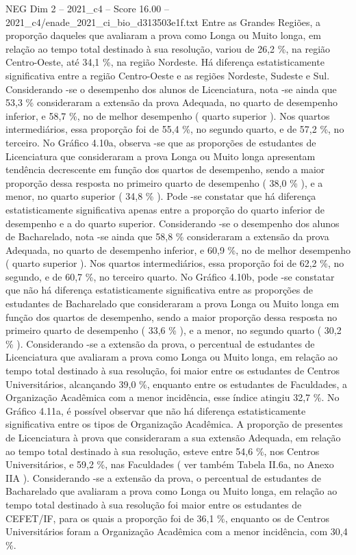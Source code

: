 \begin{textsample}{NEG Dim 2 – 2021\_c4 – Score 16.00 – 2021\_c4/enade\_2021\_ci\_bio\_d313503e1f.txt}
Entre as Grandes Regiões, a proporção daqueles que avaliaram a prova como Longa ou Muito longa, em relação ao tempo total destinado à sua resolução, variou de 26,2 \%, na região Centro-Oeste, até 34,1 \%, na região Nordeste.
Há diferença estatisticamente significativa entre a região Centro-Oeste e as regiões Nordeste, Sudeste e Sul.
Considerando -se o desempenho dos alunos de Licenciatura, nota -se ainda que 53,3 \% consideraram a extensão da prova Adequada, no quarto de desempenho inferior, e 58,7 \%, no de melhor desempenho ( quarto superior ).
Nos quartos intermediários, essa proporção foi de 55,4 \%, no segundo quarto, e de 57,2 \%, no terceiro.
No Gráfico 4.10a, observa -se que as proporções de estudantes de Licenciatura que consideraram a prova Longa ou Muito longa apresentam tendência decrescente em função dos quartos de desempenho, sendo a maior proporção dessa resposta no primeiro quarto de desempenho ( 38,0 \% ), e a menor, no quarto superior ( 34,8 \% ).
Pode -se constatar que há diferença estatisticamente significativa apenas entre a proporção do quarto inferior de desempenho e a do quarto superior.
Considerando -se o desempenho dos alunos de Bacharelado, nota -se ainda que 58,8 \% consideraram a extensão da prova Adequada, no quarto de desempenho inferior, e 60,9 \%, no de melhor desempenho ( quarto superior ).
Nos quartos intermediários, essa proporção foi de 62,2 \%, no segundo, e de 60,7 \%, no terceiro quarto.
No Gráfico 4.10b, pode -se constatar que não há diferença estatisticamente significativa entre as proporções de estudantes de Bacharelado que consideraram a prova Longa ou Muito longa em função dos quartos de desempenho, sendo a maior proporção dessa resposta no primeiro quarto de desempenho ( 33,6 \% ), e a menor, no segundo quarto ( 30,2 \% ).
Considerando -se a extensão da prova, o percentual de estudantes de Licenciatura que avaliaram a prova como Longa ou Muito longa, em relação ao tempo total destinado à sua resolução, foi maior entre os estudantes de Centros Universitários, alcançando 39,0 \%, enquanto entre os estudantes de Faculdades, a Organização Acadêmica com a menor incidência, esse índice atingiu 32,7 \%.
No Gráfico 4.11a, é possível observar que não há diferença estatisticamente significativa entre os tipos de Organização Acadêmica.
A proporção de presentes de Licenciatura à prova que consideraram a sua extensão Adequada, em relação ao tempo total destinado à sua resolução, esteve entre 54,6 \%, nos Centros Universitários, e 59,2 \%, nas Faculdades ( ver também Tabela II.6a, no Anexo IIA ).
Considerando -se a extensão da prova, o percentual de estudantes de Bacharelado que avaliaram a prova como Longa ou Muito longa, em relação ao tempo total destinado à sua resolução foi maior entre os estudantes de CEFET/IF, para os quais a proporção foi de 36,1 \%, enquanto os de Centros Universitários foram a Organização Acadêmica com a menor incidência, com 30,4 \%.

\end{textsample}
